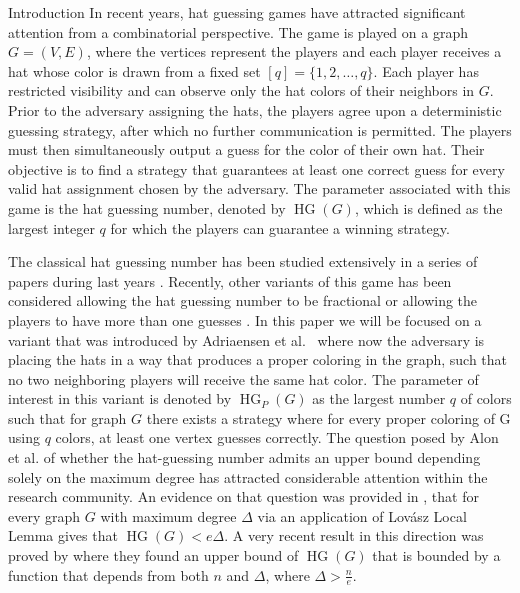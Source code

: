 \documentclass[11pt, letterpaper]{article}
\theoremstyle{plain}
\theoremstyle{plain}
\begin{document}
\begin{section}{Introduction}
In recent years, hat guessing games have attracted significant attention from a combinatorial perspective. The game is played on a graph $G = (V,E)$, where the vertices represent the players and each player receives a hat whose color is drawn from a fixed set $[q] = \{1,2,\ldots,q\}$. Each player has restricted visibility and can observe only the hat colors of their neighbors in $G$. Prior to the adversary assigning the hats, the players agree upon a deterministic guessing strategy, after which no further communication is permitted. The players must then simultaneously output a guess for the color of their own hat. Their objective is to find a strategy that guarantees at least one correct guess for every valid hat assignment chosen by the adversary. The parameter associated with this game is the hat guessing number, denoted by $\operatorname{HG}(G)$, which is defined as the largest integer $q$ for which the players can guarantee a winning strategy.

The classical hat guessing number has been studied extensively in a series of papers during last years \cite{alon2020hat,alon2022hat,wang2023hat,he2020hat,knierim2023hat,latyshev2021hats,latyshev2024hat}. Recently, other variants of this game has been considered allowing the hat guessing number to be fractional \cite{blavzej2023bears} or allowing the players to have more than one guesses \cite{bosek2021hat}. In this paper we will be focused on a variant that was introduced by Adriaensen et al.~\cite{adriaensen2026hatguessingpropercolorings} where now the adversary is placing the hats in a way that produces a proper coloring in the graph, such that no two neighboring players will receive the same hat color. The parameter of interest in this variant is denoted by $\operatorname{HG}_{P}(G)$ as the largest number $q$ of colors such that for graph $G$ there exists a strategy where for every proper coloring of G using $q$ colors, at least one vertex guesses correctly.
\newpage
The question posed by Alon et al. \cite{alon2020hat} of whether the hat-guessing number admits an upper bound depending solely on the maximum degree has attracted considerable attention within the research community.
 An evidence on that question was provided in \cite{alon2020hat}, that for every graph $G$ with maximum degree $\Delta$ via an application of Lov\'{a}sz Local Lemma gives that $\operatorname{HG}(G) < e\Delta$. A very recent result in this direction was proved by \cite{shurman2026upper} where they found an upper bound of $\operatorname{HG}(G)$ that is bounded by a function that depends from both $n$ and $\Delta$, where $\Delta > \frac{n}{e}$.


\end{section}
\end{document}
